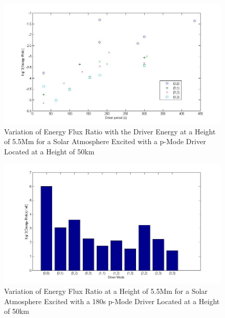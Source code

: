 \documentclass[authoryear,final,1p]{elsarticle}
\begin{document}
\clearpage

\begin{figure}[t]
\includegraphics[scale=0.4]{imagesn/ratio_varoverdrve_eflux_vperiod_for modes_5p5Mm.jpg}
\caption{Variation of Energy Flux Ratio with the Driver Energy at a Height of 5.5Mm for a Solar Atmosphere Excited with a p-Mode Driver Located at a Height of 50km}
\end{figure}


\clearpage

\begin{figure}[h]
\includegraphics[scale=0.5]{imagesn/ratio_varoverdrve_eflux_vperiod_forallmodes_180s_5p5Mm.jpg}
\caption{Variation of Energy Flux Ratio at a Height of 5.5Mm for a Solar Atmosphere Excited with a 180s p-Mode Driver Located at a Height of 50km}
\end{figure}
\end{document}

